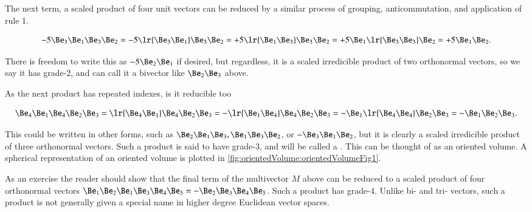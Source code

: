 
The next term, a scaled product of four unit vectors can be reduced by a similar process of grouping, anticommutation, and application of rule 1.

\begin{dmath}\label{eqn:SimpleProducts:80}
- 5 \Be_3 \Be_1 \Be_3 \Be_2
=
- 5 \lr{ \Be_3 \Be_1 } \Be_3 \Be_2
=
+ 5 \lr{ \Be_1 \Be_3 } \Be_3 \Be_2
=
+ 5 \Be_1 \lr{ \Be_3 \Be_3 } \Be_2
=
+ 5 \Be_1 \Be_2.
\end{dmath}

There is freedom to write this as \( - 5 \Be_2 \Be_1 \) if desired, but regardless, it is a
scaled irredicible product of two orthonormal vectors, so we say it has grade-2, and can call it a bivector like \( \Be_2 \Be_3 \) above.

As the next product has repeated indexes, is it reducible too

\begin{dmath}\label{eqn:SimpleProducts:100}
\Be_4 \Be_1 \Be_4 \Be_2 \Be_3
=
\lr{ \Be_4 \Be_1} \Be_4 \Be_2 \Be_3
=
-\lr{ \Be_1 \Be_4} \Be_4 \Be_2 \Be_3
=
- \Be_1 \lr{ \Be_4 \Be_4 } \Be_2 \Be_3
=
- \Be_1 \Be_2 \Be_3.
\end{dmath}

This could be written in other forms, such as \( \Be_2 \Be_1 \Be_3, \Be_1 \Be_3 \Be_2 \), or \( -\Be_3 \Be_1 \Be_2 \), but it is clearly a scaled irredicible product of three orthonormal vectors.  Such a product is said to have grade-3, and will be called a .  This can be thought of as an oriented volume.
A spherical representation of an oriented volume is plotted in \cref{fig:orientedVolume:orientedVolumeFig1}.

As an exercise the reader should show that the final term of the multivector \( M \) above can be reduced to a scaled product of four orthonormal vectors \( \Be_1 \Be_2 \Be_1 \Be_3 \Be_4 \Be_5 = -\Be_2 \Be_3 \Be_4 \Be_5 \).  Such a product has grade-4.  Unlike bi- and tri- vectors, such a product is not generally given a special name in higher degree Euclidean vector spaces.

